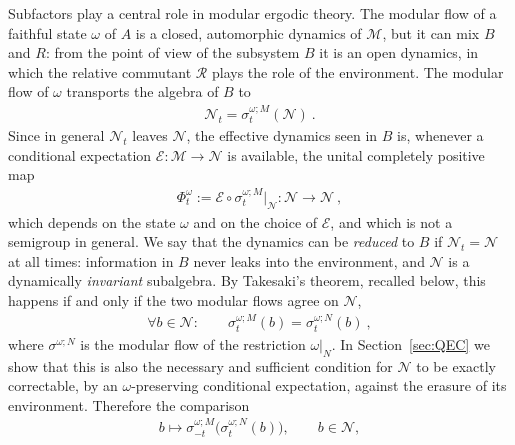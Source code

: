 \documentclass[a4paper,11pt]{article}
\theoremstyle{definition}
\newcommand{\mB}{\mathcal{B}}%
\newcommand{\mN}{\mathcal{N}}
\newcommand{\mM}{\mathcal{M}}
\newcommand{\mT}{\mathcal{T}}
\newcommand{\mE}{\mathcal{E}}
\begin{document}
Subfactors play a central role in modular ergodic theory. The modular flow of a faithful state $\omega$ of $A$ is a closed, automorphic dynamics of $\mathcal M$, but it can mix $B$ and $R$: from the point of view of the subsystem $B$ it is an open dynamics, in which the relative commutant $\mathcal R$ plays the role of the environment. The modular flow of $\omega$ transports the algebra of $B$ to
\begin{align}
    \mathcal N_t=\sigma^{\omega;M}_t(\mathcal N)\ .
\end{align}
Since in general $\mathcal N_t$ leaves $\mathcal N$, the effective dynamics seen in $B$ is, whenever a conditional expectation $\mathcal E:\mathcal M\to\mathcal N$ is available, the unital completely positive map
\begin{align}
    \Phi^{\omega}_t:=\mathcal E\circ\sigma^{\omega;M}_t\big|_{\mathcal N}:\mathcal N\to\mathcal N\ ,
    \label{eq:reduced-dynamics}
\end{align}
which depends on the state $\omega$ and on the choice of $\mathcal E$, and which is not a semigroup in general. We say that the dynamics can be \emph{reduced} to $B$ if $\mathcal N_t=\mathcal N$ at all times: information in $B$ never leaks into the environment, and $\mathcal N$ is a dynamically \emph{invariant} subalgebra. By Takesaki's theorem, recalled below, this happens if and only if the two modular flows agree on $\mathcal N$,
\begin{align}
    \forall b\in\mathcal N:\qquad \sigma^{\omega;M}_t(b)=\sigma^{\omega;N}_t(b)\ ,
\end{align}
where $\sigma^{\omega;N}$ is the modular flow of the restriction $\omega|_N$. In Section~\ref{sec:QEC} we show that this is also the necessary and sufficient condition for $\mathcal N$ to be exactly correctable, by an $\omega$-preserving conditional expectation, against the erasure of its environment. Therefore the comparison
\begin{align}
    b\longmapsto\sigma^{\omega;M}_{-t}\bigl(\sigma^{\omega;N}_t(b)\bigr),\qquad b\in\mathcal N,
    \label{eq:subsystem-flow-preview}
\end{align}
\end{document}
